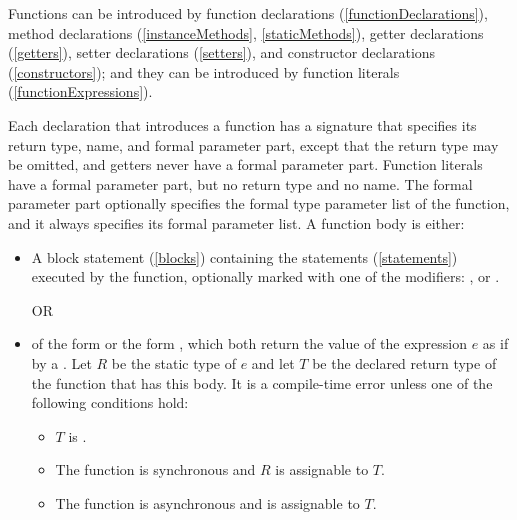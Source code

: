 \documentclass[makeidx]{article}
\begin{document}
\LMHash{}%
Functions can be introduced by function declarations (\ref{functionDeclarations}),
method declarations (\ref{instanceMethods}, \ref{staticMethods}),
getter declarations (\ref{getters}),
setter declarations (\ref{setters}),
and constructor declarations (\ref{constructors});
and they can be introduced by function literals (\ref{functionExpressions}).

\LMHash{}%
Each declaration that introduces a function has a signature that specifies its return type, name, and formal parameter part,
except that the return type may be omitted, and getters never have a formal parameter part.
Function literals have a formal parameter part, but no return type and no name.
The formal parameter part optionally specifies the formal type parameter list of the function,
and it always specifies its formal parameter list.
A function body is either:
\begin{itemize}
\item A block statement (\ref{blocks}) containing the statements (\ref{statements}) executed by the function, optionally marked with one of the modifiers: \ASYNC, \code{\ASYNC*} or \code{\SYNC*}.


OR
\item of the form  or the form , which both return the value of the expression $e$ as if by a .
  Let $R$ be the static type of $e$
  and let $T$ be the declared return type of the function that has this body.
  It is a compile-time error unless one of the following conditions hold:
  \begin{itemize}
  \item $T$ is \VOID{}.
  \item The function is synchronous and $R$ is assignable to $T$.
  \item The function is asynchronous and  is assignable to $T$.
  \end{itemize}
\end{itemize}
\end{document}
